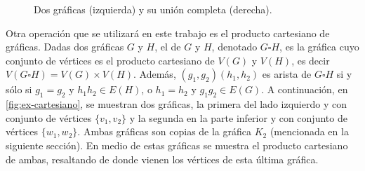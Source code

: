 \begin{figure}[htb!]
    \centering
    \caption{Dos gr\'aficas (izquierda) y su uni\'on completa (derecha).}
\label{fig:ex-unionCompleta}
\end{figure}

Otra operaci\'on que se utilizar\'a en este trabajo es el producto cartesiano de
gr\'aficas. Dadas dos gr\'aficas $G$ y $H$, el  de
$G$ y $H$, denotado $G \square H$, es la gr\'afica cuyo conjunto de v\'ertices
es el producto cartesiano de $V(G)$ y $V(H)$, es decir $V(G \square H) = V(G)
\times V(H)$. Adem\'as, $(g_1,g_2)(h_1,h_2)$ es arista de $G \square H$ si y
s\'olo si $g_1 = g_2$ y $h_1h_2 \in E(H)$, o $h_1 = h_2$ y $g_1g_2 \in E(G)$. A
continuaci\'on, en \cref{fig:ex-cartesiano}, se muestran dos gr\'aficas, la
primera del lado izquierdo y con conjunto de v\'ertices $\{v_1, v_2\}$ y la
segunda en la parte inferior y con conjunto de v\'ertices $\{w_1,w_2\}$. Ambas
gr\'aficas son copias de la gr\'afica $K_2$ (mencionada en la siguiente
secci\'on). En medio de estas gr\'aficas se muestra el producto cartesiano de
ambas, resaltando de donde vienen los v\'ertices de esta \'ultima gr\'afica.

